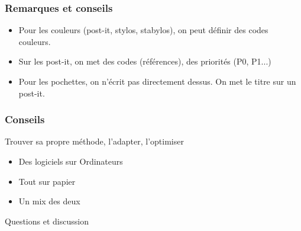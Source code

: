 \documentclass{beamer}
\begin{document}
\begin{frame}
\frametitle{Remarques et conseils}
\begin{itemize}
\item Pour les couleurs (post-it, stylos, stabylos), on peut définir des codes couleurs.
\item Sur les post-it, on met des codes (références), des priorités (P0, P1...)
\item Pour les pochettes, on n'écrit pas directement dessus. On met le titre sur un post-it.
\end{itemize}
\end{frame}

\begin{frame}
\frametitle{Conseils}
Trouver sa propre méthode, l'adapter, l'optimiser
\begin{itemize}
\item Des logiciels sur Ordinateurs
\item Tout sur papier
\item Un mix des deux
\end{itemize}
\end{frame}

\begin{frame}
\begin{center}
\Huge{Questions et discussion}
\end{center}
\end{frame}
\end{document}
